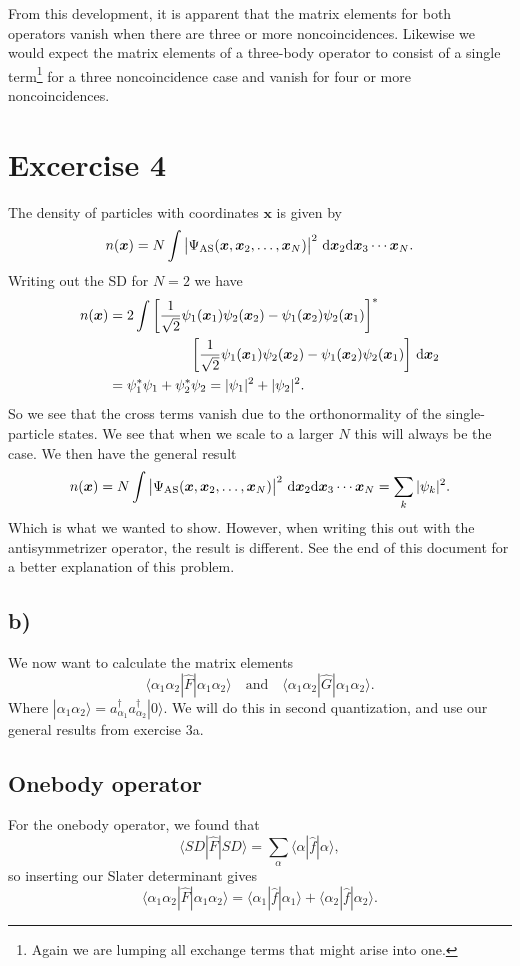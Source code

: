 \documentclass[a4paper, 11pt, notitlepage, english]{article}
\newcommand{\ket}[1]{|#1 \rangle}
\newcommand{\op}[1]{\hat{#1}}
\newcommand{\braopket}[3]{\langle #1 | {#2} | #3 \rangle}
\renewcommand{\d}{{\rm d}}
\newcommand{\bt}[1]{\boldsymbol{#1}}
\begin{document}
From this development, it is apparent that the matrix elements for both operators vanish when there are three or more noncoincidences. Likewise we would expect the matrix elements of a three-body operator to consist of a single term\footnote{Again we are lumping all exchange terms that might arise into one.} for a three noncoincidence case and vanish for four or more noncoincidences.

\section*{Excercise 4}
The density of particles with coordinates $\bt{x}$ is given by
$$n(\bt x) = N \int \big|\Psi_{\rm AS}(\bt{x}, \bt{x}_2, \ldots, \bt{x}_N)\big|^2 \ \d \bt{x}_2\d \bt{x}_3\cdots\bt{x}_N.$$
Writing out the SD for $N=2$ we have
\begin{align*}
n(\bt{x}) &= 2 \int \bigg[\frac{1}{\sqrt{2}}\psi_1(\bt{x}_1)\psi_2(\bt{x}_2) - \psi_1(\bt{x}_2)\psi_2(\bt{x}_1)\bigg]^* \\
&\qquad\qquad\qquad \bigg[\frac{1}{\sqrt{2}}\psi_1(\bt{x}_1)\psi_2(\bt{x}_2) - \psi_1(\bt{x}_2)\psi_2(\bt{x}_1)\bigg] \ \d \bt{x}_2 \\
&= \psi_1^*\psi_1 +  \psi_2^*\psi_2 = |\psi_1|^2 + |\psi_2|^2.
\end{align*}
So we see that the cross terms vanish due to the orthonormality of the single-particle states. We see that when we scale to a larger $N$ this will always be the case. We then have the general result
$$n(\bt x) = N \int \big|\Psi_{\rm AS}(\bt{x}, \bt{x}_2, \ldots, \bt{x}_N)\big|^2 \ \d \bt{x}_2\d \bt{x}_3\cdots\bt{x}_N = \sum_k |\psi_k|^2.$$
Which is what we wanted to show. However, when writing this out with the antisymmetrizer operator, the result is different. See the end of this document for a better explanation of this problem.

\clearpage
\subsection*{b)}
We now want to calculate the matrix elements
$$\braopket{\alpha_1 \alpha_2}{\op{F}}{\alpha_1 \alpha_2} \quad \mbox{and} \quad \braopket{\alpha_1 \alpha_2}{\op{G}}{\alpha_1 \alpha_2}.$$
Where $\ket{\alpha_1\alpha_2} = a_{\alpha_1}^\dag a_{\alpha_2}^\dag\ket{0}$. We will do this in second quantization, and use our general results from exercise 3a.

\subsection*{Onebody operator}
For the onebody operator, we found that
$$\braopket{SD}{\op{F}}{SD} = \sum_\alpha \braopket{\alpha}{\op{f}}{\alpha},$$
so inserting our Slater determinant gives
$$\braopket{\alpha_1 \alpha_2}{\op{F}}{\alpha_1 \alpha_2} = \braopket{\alpha_1}{\op{f}}{\alpha_1} + \braopket{\alpha_2}{\op{f}}{\alpha_2}.$$
\end{document}
